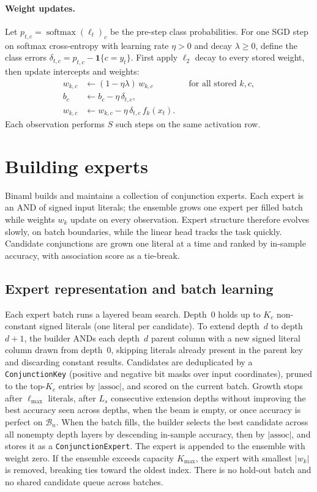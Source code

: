 \documentclass[11pt]{article}
\begin{document}
\paragraph{Weight updates.}
Let $p_{t,c}=\operatorname{softmax}(\ell_t)_c$ be the pre-step class
probabilities.  For one SGD step on softmax cross-entropy with learning rate
$\eta>0$ and decay $\lambda\geq 0$, define the class errors
$\delta_{t,c}=p_{t,c}-\mathbf{1}\{c=y_t\}$.  First apply $\ell_2$ decay to
every stored weight, then update intercepts and weights:
\begin{align*}
w_{k,c} &\leftarrow (1-\eta\lambda)\,w_{k,c}
&&\text{for all stored }k,c,\\
b_c &\leftarrow b_c-\eta\,\delta_{t,c},\\
w_{k,c} &\leftarrow w_{k,c}-\eta\,\delta_{t,c}\,f_k(x_t).
\end{align*}
Each observation performs $S$ such steps on the same activation row.

\section{Building experts}
Binaml builds and maintains a collection of conjunction experts.  Each expert is
an AND of signed input literals; the ensemble grows one expert per filled batch
while weights $w_k$ update on every observation.  Expert structure therefore
evolves slowly, on batch boundaries, while the linear head tracks the task
quickly.  Candidate conjunctions are grown one literal at a time and ranked by
in-sample accuracy, with association score as a tie-break.

\subsection{Expert representation and batch learning}
Each expert batch runs a layered beam search.  Depth~$0$ holds up to $K_c$
non-constant signed literals (one literal per candidate).  To extend depth~$d$
to depth~$d{+}1$, the builder ANDs each depth~$d$ parent column with a new
signed literal column drawn from depth~$0$, skipping literals already present in
the parent key and discarding constant results.  Candidates are deduplicated by
a \texttt{ConjunctionKey} (positive and negative bit masks over input
coordinates), pruned to the top-$K_c$ entries by $|\text{assoc}|$, and scored on
the current batch.  Growth stops after $\ell_{\max}$ literals, after $L_s$
consecutive extension depths without improving the best accuracy seen across
depths, when the beam is empty, or once accuracy is perfect on
$\mathcal B_n$.  When the batch fills, the builder selects the best candidate
across all nonempty depth layers by descending in-sample accuracy, then by
$|\text{assoc}|$, and stores it as a \texttt{ConjunctionExpert}.  The expert is
appended to the ensemble with weight zero.  If the ensemble exceeds capacity
$K_{\max}$, the expert with smallest $|w_k|$ is removed, breaking ties toward
the oldest index.  There is no hold-out batch and no shared candidate queue
across batches.
\end{document}
